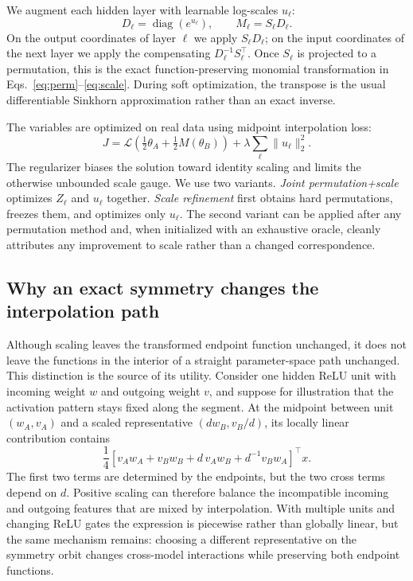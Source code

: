 \documentclass{article}
\newcommand{\loss}{\mathcal{L}}
\begin{document}
We augment each hidden layer with learnable log-scales $u_\ell$:
\begin{equation}
D_\ell=\operatorname{diag}(e^{u_\ell}),\qquad
M_\ell=S_\ell D_\ell.
\label{eq:monomial}
\end{equation}
On the output coordinates of layer $\ell$ we apply $S_\ell D_\ell$; on the
input coordinates of the next layer we apply the compensating
$D_\ell^{-1}S_\ell^\top$.  Once $S_\ell$ is projected to a permutation, this is
the exact function-preserving monomial transformation in
Eqs.~\ref{eq:perm}--\ref{eq:scale}.  During soft optimization, the transpose is
the usual differentiable Sinkhorn approximation rather than an exact inverse.

The variables are optimized on real data using midpoint interpolation loss:
\begin{equation}
J=\loss\!\left(\tfrac12\theta_A+\tfrac12 M(\theta_B)\right)
+\lambda\sum_\ell\lVert u_\ell\rVert_2^2.
\label{eq:objective}
\end{equation}
The regularizer biases the solution toward identity scaling and limits the
otherwise unbounded scale gauge.  We use two variants.  \emph{Joint
permutation+scale} optimizes $Z_\ell$ and $u_\ell$ together.  \emph{Scale
refinement} first obtains hard permutations, freezes them, and optimizes only
$u_\ell$.  The second variant can be applied after any permutation method and,
when initialized with an exhaustive oracle, cleanly attributes any improvement
to scale rather than a changed correspondence.

\subsection{Why an exact symmetry changes the interpolation path}

Although scaling leaves the transformed endpoint function unchanged, it does
not leave the functions in the interior of a straight parameter-space path
unchanged.  This distinction is the source of its utility.  Consider one hidden
ReLU unit with incoming weight $w$ and outgoing weight $v$, and suppose for
illustration that the activation pattern stays fixed along the segment.  At the
midpoint between unit $(w_A,v_A)$ and a scaled representative
$(d w_B,v_B/d)$, its locally linear contribution contains
\begin{equation}
\frac{1}{4}\left[v_A w_A+v_B w_B+d\,v_A w_B+d^{-1}v_B w_A\right]^\top x.
\label{eq:cross-terms}
\end{equation}
The first two terms are determined by the endpoints, but the two cross terms
depend on $d$.  Positive scaling can therefore balance the incompatible
incoming and outgoing features that are mixed by interpolation.  With multiple
units and changing ReLU gates the expression is piecewise rather than globally
linear, but the same mechanism remains: choosing a different representative on
the symmetry orbit changes cross-model interactions while preserving both
endpoint functions.
\end{document}
